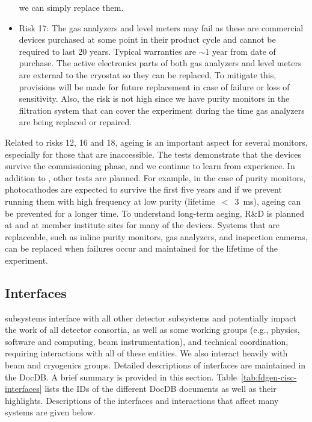 \begin{itemize}
    we can simply replace them.
    \item Risk 17: The gas analyzers and level meters may fail as these are commercial devices purchased at some point in their product cycle and cannot be required to last 20 years. Typical warranties are $\sim$1 year from date of purchase. The active electronics parts of both gas analyzers and level meters are external to the cryostat so they can be replaced. To mitigate this, provisions will be made for future replacement in case of failure or loss of sensitivity. Also, the risk is not high since we have purity monitors in the filtration system that can cover the experiment during the time gas analyzers are being replaced or repaired. 
\end{itemize}

Related to risks 12, 16 and 18, ageing is an important aspect for several monitors, especially for those that are inaccessible. The  tests demonstrate that the devices survive the commissioning phase, and we continue to learn from  experience. In addition to , other tests are planned. For example, in the case of purity monitors, photocathodes are expected to survive the first five years and if we prevent running them with high frequency at low purity (lifetime~$<$~\SI{3}{\milli\second}), ageing can be prevented for a longer time. To understand long-term aeging, R\&D is planned at  and at member institute sites for many of the devices. %
Systems that are replaceable, such as inline purity monitors, gas analyzers, and inspection cameras, can be replaced when failures occur and maintained for the lifetime of the experiment.
 





\subsection{Interfaces} 
\label{sec:interfaces}

 subsystems interface with all other detector subsystems and potentially impact the work of all detector consortia, as well as some
working groups (e.g., physics, software and computing, beam instrumentation), and technical coordination, requiring interactions with all of these entities.  We also interact heavily with  beam and cryogenics groups.  
Detailed descriptions of  interfaces are maintained in the  DocDB. A brief summary is provided in this section. Table~\ref{tab:fdgen-cisc-interfaces} lists the IDs of the different DocDB documents as well as their highlights. Descriptions of the interfaces and interactions that affect many systems are given below. 

